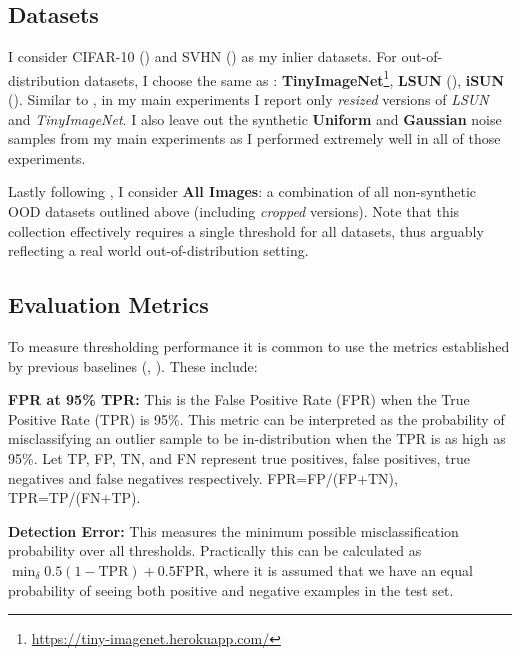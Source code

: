 

\subsection*{Datasets}
\label{datasets}
I consider CIFAR-10 (\cite{Krizhevsky2009learning}) and SVHN (\cite{Netzer2011reading}) as my inlier datasets. For out-of-distribution datasets, I choose the same as \cite{Liang2017}: \textbf{TinyImageNet}\footnote{\url{https://tiny-imagenet.herokuapp.com/}}, \textbf{LSUN} (\cite{Yu2015lsun}), \textbf{iSUN} (\cite{Xu2015turkergaze}). Similar to \cite{Devries}, in my main experiments I report only \textit{resized} versions of \textit{LSUN} and \textit{TinyImageNet}. I also leave out the synthetic \textbf{Uniform} and \textbf{Gaussian} noise samples from my main experiments as I performed extremely well in all of those experiments.

Lastly following \cite{Devries}, I consider \textbf{All Images}: a combination of all non-synthetic OOD datasets outlined above (including \textit{cropped} versions). Note that this collection effectively requires a single threshold for all datasets, thus arguably reflecting a real world out-of-distribution setting.

\subsection*{Evaluation Metrics}

To measure thresholding performance it is common to use the metrics established by previous baselines (\cite{Hendrycks2019}, \cite{Liang2017}). These include:

\textbf{FPR at 95\% TPR:} This is the False Positive Rate (FPR) when the True Positive Rate (TPR) is 95\%. This metric can be interpreted as the probability of misclassifying an outlier sample to be in-distribution when the TPR is as high as 95\%. Let TP, FP, TN, and FN represent true positives, false positives, true negatives and false negatives respectively. FPR=FP/(FP+TN), TPR=TP/(FN+TP).

\textbf{Detection Error:} This measures the minimum possible misclassification probability over all thresholds. Practically this can be calculated as $\min_{\delta} 0.5(1-\text{TPR}) + 0.5\text{FPR}$, where it is assumed that we have an equal probability of seeing both positive and negative examples in the test set.

